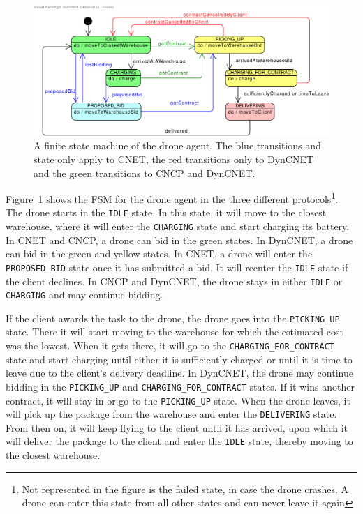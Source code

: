 \documentclass[10pt,a4paper]{article}
\newcommand{\commentV}[1]{\todo[inline, color=yellow]{Victor: #1}}
\begin{document}
\begin{figure}[htp]
    \centering
    \includegraphics[width=\columnwidth]{Drone}
    \caption{A finite state machine of the drone agent. The blue transitions and state only apply to CNET, the red transitions only to DynCNET and the green transitions to CNCP and DynCNET.  \commentV{te klein in twocolumn?}}
    \label{fig:droneFSM}
\end{figure}

Figure~\ref{fig:droneFSM} shows the FSM for the drone agent in the three different protocols\footnote{Not represented in the figure is the failed state, in case the drone crashes. A drone can enter this state from all other states and can never leave it again}. The drone starts in the \texttt{IDLE} state. In this state, it will move to the closest warehouse, where it will enter the \texttt{CHARGING} state and start charging its battery. In CNET and CNCP, a drone can bid in the green states. In DynCNET, a drone can bid in the green and yellow states. In CNET, a drone will enter the \texttt{PROPOSED\_BID} state once it has submitted a bid. It will reenter the \texttt{IDLE} state if the client declines. In CNCP and DynCNET, the drone stays in either \texttt{IDLE} or \texttt{CHARGING} and may continue bidding.

If the client awards the task to the drone, the drone goes into the \texttt{PICKING\_UP} state. There it will start moving to the warehouse for which the estimated cost was the lowest. When it gets there, it will go to the \texttt{CHARGING\_FOR\_CONTRACT} state and start charging until either it is sufficiently charged or until it is time to leave due to the client's delivery deadline. In DynCNET, the drone may continue bidding in the \texttt{PICKING\_UP} and \texttt{CHARGING\_FOR\_CONTRACT} states. If it wins another contract, it will stay in or go to the \texttt{PICKING\_UP} state. When the drone leaves, it will pick up the package from the warehouse and enter the \texttt{DELIVERING} state. From then on, it will keep flying to the client until it has arrived, upon which it will deliver the package to the client and enter the \texttt{IDLE} state, thereby moving to the closest warehouse.
\end{document}
